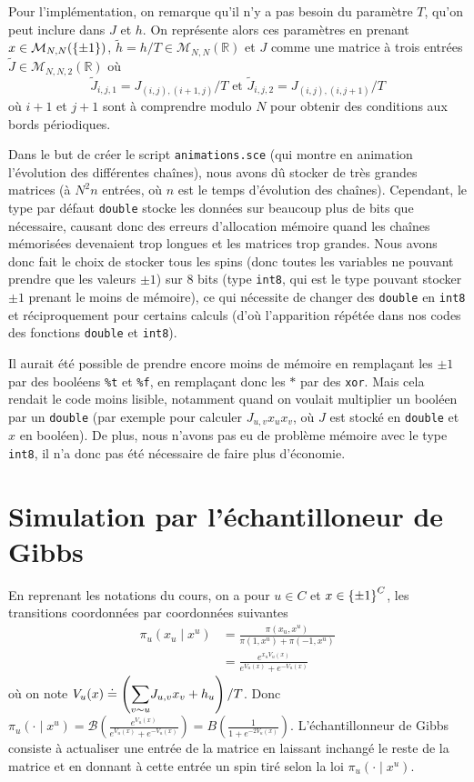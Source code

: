 \documentclass[a4paper,11pt]{article}
\begin{document}
Pour l'implémentation, on remarque qu'il n'y a pas besoin du paramètre $T$, qu'on peut inclure dans $J$ et $h$. On représente alors ces paramètres en prenant $x \in \mathcal M_{N,N}(\left\lbrace \pm 1 \right\rbrace)$, $\tilde h = h/T \in \mathcal M_{N,N}(\mathbb R)$ et $J$ comme une matrice à trois entrées $\tilde J \in \mathcal M_{N,N,2}(\mathbb R)$ où
$$\tilde J_{i,j,1} = J_{(i,j),(i+1,j)}/T \text{ et } \tilde J_{i,j,2} = J_{(i,j),(i,j+1)}/T$$
où $i+1$ et $j+1$ sont à comprendre modulo $N$ pour obtenir des conditions aux bords périodiques.

Dans le but de créer le script \texttt{animations.sce} (qui montre en animation l'évolution des différentes chaînes), nous avons dû stocker de très grandes matrices (à $N^2n$ entrées, où $n$ est le temps d'évolution des chaînes). Cependant, le type par défaut \texttt{double} stocke les données sur beaucoup plus de bits que nécessaire, causant donc des erreurs d'allocation mémoire quand les chaînes mémorisées devenaient trop longues et les matrices trop grandes. Nous avons donc fait le choix de stocker tous les spins (donc toutes les variables ne pouvant prendre que les valeurs $\pm 1$) sur 8 bits (type \texttt{int8}, qui est le type pouvant stocker $\pm 1$ prenant le moins de mémoire), ce qui nécessite de changer des \texttt{double} en \texttt{int8} et réciproquement pour certains calculs (d'où l'apparition répétée dans nos codes des fonctions \texttt{double} et \texttt{int8}).

Il aurait été possible de prendre encore moins de mémoire en remplaçant les $\pm 1$ par des booléens \texttt{\%t} et \texttt{\%f}, en remplaçant donc les $*$ par des \texttt{xor}. Mais cela rendait le code moins lisible, notamment quand on voulait multiplier un booléen par un \texttt{double} (par exemple pour calculer $J_{u,v} x_{u} x_{v}$, où $J$ est stocké en \texttt{double} et $x$ en booléen). De plus, nous n'avons pas eu de problème mémoire avec le type \texttt{int8}, il n'a donc pas été nécessaire de faire plus d'économie.

\section{Simulation par l'échantilloneur de Gibbs}\label{sec:gibbs}

En reprenant les notations du cours, on a pour $u \in C$ et $x \in \left\lbrace \pm 1 \right\rbrace^C$, les transitions coordonnées par coordonnées suivantes
\begin{align*}
\pi_u(x_u \mid x^u)
&= \frac{\pi(x_u,x^u)}{\pi(1,x^u) + \pi(-1,x^u)}\\
&= \frac{e^{x_u V_u(x)}}{e^{V_u(x)} + e^{-V_u(x)}}
\end{align*}
où on note $V_u(x) \doteq \left( \displaystyle{\sum_{v \sim u}^{}} J_{u,v} x_v + h_u \right) /T$. Donc $\pi_u(\cdot \mid x^u) = \mathcal B(\frac{e^{V_u(x)}}{e^{V_u(x)} + e^{-V_u(x)}}) = B(\frac{1}{1 + e^{-2V_u(x)}})$. L'échantillonneur de Gibbs consiste à actualiser une entrée de la matrice en laissant inchangé le reste de la matrice et en donnant à cette entrée un spin tiré selon la loi $\pi_u(\cdot \mid x^u)$.
\end{document}
